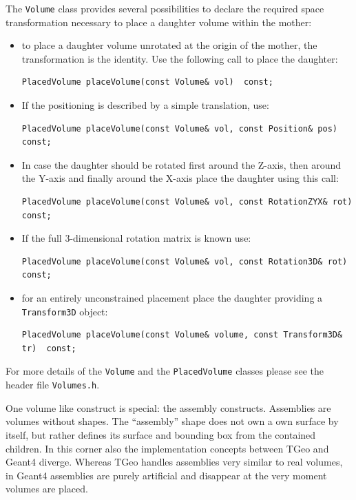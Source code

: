 The {\texttt{Volume}} class provides several possibilities to declare the required space transformation necessary to place a daughter volume  within the mother:
\begin{itemize}
\item to place a daughter volume unrotated at the origin of the mother, the 
transformation is the identity. Use the following call to place the daughter:
\begin{verbatim}
PlacedVolume placeVolume(const Volume& vol)  const;
\end{verbatim}
\item If the positioning is described by a simple translation, use:
\begin{verbatim}
PlacedVolume placeVolume(const Volume& vol, const Position& pos)  const;
\end{verbatim}
\item In case the daughter should be rotated first around the Z-axis, then around the Y-axis and finally around the X-axis place the daughter using this call:
\begin{verbatim}
PlacedVolume placeVolume(const Volume& vol, const RotationZYX& rot)  const;
\end{verbatim}
\item If the full 3-dimensional rotation matrix is known use:
\begin{verbatim}
PlacedVolume placeVolume(const Volume& vol, const Rotation3D& rot)  const;
\end{verbatim}
\item for an entirely unconstrained placement place the daughter providing a \texttt{Transform3D} object:
\begin{verbatim}
PlacedVolume placeVolume(const Volume& volume, const Transform3D& tr)  const;
\end{verbatim}
\end{itemize}

For more details of the \texttt{Volume} and the \texttt{PlacedVolume} classes please see the header file \texttt{Volumes.h}.

One volume like construct is special: the assembly constructs. Assemblies are volumes without shapes. The ``assembly'' shape does not own a own surface by itself, but rather defines its surface and
bounding box from the contained children. In this corner also the implementation concepts between TGeo and Geant4 diverge. Whereas TGeo handles assemblies very similar to real volumes, in Geant4 assemblies are purely artificial and disappear at the very moment volumes  are placed.

